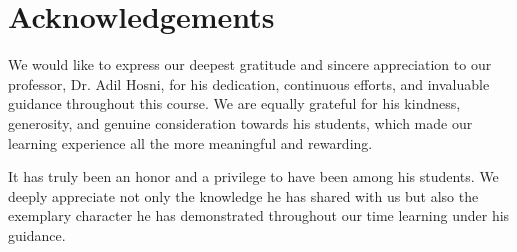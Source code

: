 
\chapter*{Acknowledgements}
\thispagestyle{empty}


We would like to express our deepest gratitude and sincere appreciation to our professor, Dr. Adil Hosni, for his dedication, continuous efforts, and invaluable guidance throughout this course. We are equally grateful for his kindness, generosity, and genuine consideration towards his students, which made our learning experience all the more meaningful and rewarding.

It has truly been an honor and a privilege to have been among his students. We deeply appreciate not only the knowledge he has shared with us but also the exemplary character he has demonstrated throughout our time learning under his guidance.
